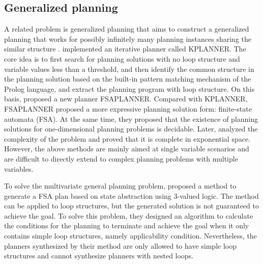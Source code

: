 \documentclass[review]{elsarticle}
\begin{document}
\subsection{Generalized planning} 
A related problem is generalized planning that aims to construct a generalized planning that works for possibly infinitely many planning instances sharing the similar structure \cite{Lev2005}.
\citet{Lev2005} implemented an iterative planner called KPLANNER. 
The core idea is to first search for planning solutions with no loop structure and variable values less than a threshold, and then identify the common structure in the planning solution based on the built-in pattern matching mechanism of the Prolog language, and extract the planning program with loop structure. 
On this basis, \citet{HuL2010} proposed a new planner FSAPLANNER. Compared with KPLANNER, FSAPLANNER proposed a more expressive planning solution form: finite-state automata (FSA). 
At the same time, they proposed that the existence of planning solutions for one-dimensional planning problems is decidable. 
Later, \citet{HuG2011} analyzed the complexity of the problem and proved that it is complete in exponential space. 
However, the above methods are mainly aimed at single variable scenarios and are difficult to directly extend to complex planning problems with multiple variables.

To solve the multivariate general planning problem, \citet{SriIZ2011} proposed a method to generate a FSA plan based on state abstraction using 3-valued logic. 
The method can be applied to loop structures, but the generated solution is not guaranteed to achieve the goal. 
To solve this problem, they designed an algorithm to calculate the conditions for the planning to terminate and achieve the goal when it only contains simple loop structures, namely applicability
condition\cite{SriIZ2012}. 
Nevertheless, the planners synthesized by their method are only allowed to have simple loop structures and cannot synthesize planners with nested loops.
\end{document}
